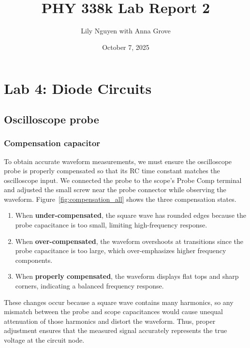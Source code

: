 \documentclass{article}
\title{PHY 338k Lab Report 2}
\author{Lily Nguyen with Anna Grove}
\date{October 7, 2025}
\begin{document}
\maketitle

\section{Lab 4: Diode Circuits}

\subsection{Oscilloscope probe}

\subsubsection{Compensation capacitor}

To obtain accurate waveform measurements, we must ensure the oscilloscope probe
is properly compensated so that its RC time constant matches the oscilloscope
input. We connected the probe to the scope's Probe Comp terminal and adjusted
the small screw near the probe connector while observing the waveform.
Figure~\ref{fig:compensation_all} shows the three compensation states.

\begin{enumerate}
    \item When \textbf{under-compensated}, the square wave has rounded edges
    because the probe capacitance is too small, limiting high-frequency response.
    \item When \textbf{over-compensated}, the waveform overshoots at transitions
    since the probe capacitance is too large, which over-emphasizes higher
    frequency components.
    \item When \textbf{properly compensated}, the waveform displays flat tops
    and sharp corners, indicating a balanced frequency response.
\end{enumerate}

\noindent These changes occur because a square wave contains many harmonics,
so any mismatch between the probe and scope capacitances would cause unequal
attenuation of those harmonics and distort the waveform. Thus, proper adjustment
ensures that the measured signal accurately represents the true voltage at the
circuit node.
\end{document}
